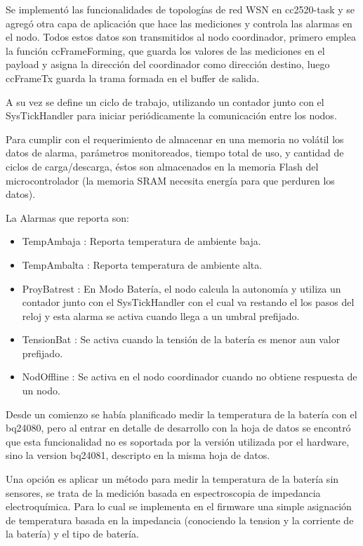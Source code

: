 {\begin{table}[ht]
\begin{tabular}{@{} l *3c @{}}
		\bottomrule
		\hline
	\end{tabular}
	\label{tab:bq}
\end{table}

Se implementó las funcionalidades de topologías de red WSN en cc2520-task y se agregó otra capa de aplicación que hace las mediciones y controla las alarmas en el nodo. Todos estos datos son transmitidos al nodo coordinador, primero emplea la función ccFrameForming, que guarda los valores de las mediciones en el payload y asigna la dirección del coordinador como dirección destino, luego ccFrameTx guarda la trama formada en el buffer de salida.

A su vez se define un ciclo de trabajo, utilizando un contador junto con el SysTickHandler para iniciar periódicamente la comunicación entre los nodos. 

Para cumplir con el requerimiento de almacenar en una memoria no volátil los datos de alarma, parámetros monitoreados, tiempo total de uso, y cantidad de ciclos de carga/descarga, éstos son almacenados en la memoria Flash del microcontrolador (la memoria SRAM necesita energía para que perduren los datos). 

\noindent La Alarmas que reporta son:
	\begin{itemize}
	\item TempAmbaja : Reporta temperatura de ambiente baja.
	\item TempAmbalta : Reporta temperatura de ambiente alta.
	\item ProyBatrest : En Modo Batería, el nodo calcula la autonomía y utiliza un contador junto con el SysTickHandler con el cual va restando el los pasos del reloj y esta alarma se activa cuando llega a un umbral prefijado.
	\item TensionBat : Se activa cuando la tensión de la batería es menor aun valor prefijado.
	\item NodOffline : Se activa en el nodo coordinador cuando no obtiene respuesta de un nodo.
	\end{itemize}

Desde un comienzo se había planificado medir la temperatura de la batería con el bq24080, pero al entrar en detalle de desarrollo con la hoja de datos se encontró que esta funcionalidad no es soportada por la versión utilizada por el hardware, sino la version bq24081, descripto en la misma hoja de datos.

Una opción es aplicar un método para medir la temperatura de la batería sin sensores, se trata de la medición basada en espectroscopia de impedancia electroquímica\citep{metodo}. Para lo cual se implementa en el firmware una simple asignación de temperatura basada en la impedancia (conociendo la tension y la corriente de la batería) y el tipo de batería.

}
